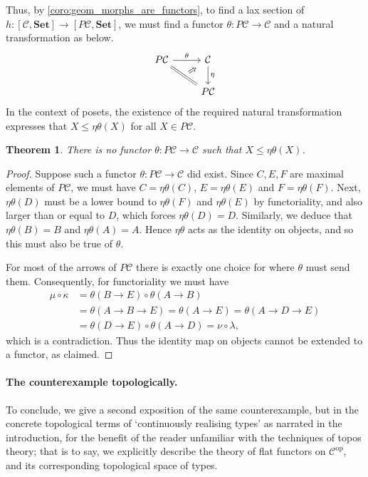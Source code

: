 \documentclass{article}
\theoremstyle{plain}
\newtheorem{thm}{Theorem}[section]
\theoremstyle{definition}
\newcommand{\cat}{\mathcal{C}}
\newcommand{\Set}{\mathbf{Set}}
\newcommand{\op}{^{\mathrm{op}}}
\begin{document}
	Thus, by \cref{coro:geom_morphs_are_functors}, to find a lax section of $h \colon [\cat,\Set] \to [P\cat,\Set]$, we must find a functor $\theta \colon P \cat \to \cat$ and a natural transformation as below.
	\[\begin{tikzcd}
		{P \cat} & \cat \\
		& {P \cat}
		\arrow["\theta", from=1-1, to=1-2]
		\arrow[""{name=0, anchor=center, inner sep=0}, equals, from=1-1, to=2-2]
		\arrow["\eta", from=1-2, to=2-2]
		\arrow["\Rightarrow"{marking, allow upside down}, draw=none, from=0, to=1-2]
	\end{tikzcd}\]
	In the context of posets, the existence of the required natural transformation expresses that $X \leqslant \eta \theta(X) $ for all $X \in P\cat$.
	\begin{thm}\label{thm:counterexample}
		There is no functor $\theta \colon P\cat \to \cat$ such that $X \leqslant \eta \theta (X)$.
	\end{thm}
	\begin{proof}
		Suppose such a functor $\theta \colon P \cat \to \cat$ did exist.  Since $C,E,F$ are maximal elements of $P \cat$, we must have $C = \eta \theta (C)$, $E = \eta \theta (E)$ and $F = \eta \theta (F)$.  Next, $\eta \theta (D)$ must be a lower bound to $\eta \theta (F)$ and $\eta \theta (E)$ by functoriality, and also larger than or equal to $D$, which forces $\eta \theta (D) = D$.  Similarly, we deduce that $\eta \theta (B) = B$ and $\eta \theta (A) = A$.  Hence $\eta \theta$ acts as the identity on objects, and so this must also be true of $\theta$.
		
		For most of the arrows of $P \cat$ there is exactly one choice for where $\theta$ must send them. Consequently, for functoriality we must have
		\begin{align*}
			\mu \circ \kappa &= \theta (B \to E) \circ \theta (A \to B) \\
			& = \theta (A \to B \to E) = \theta (A \to E) = \theta (A \to D \to E) \\
			& = \theta (D \to E) \circ \theta (A \to D) = \nu \circ \lambda,
		\end{align*}
		which is a contradiction. Thus the identity map on objects cannot be extended to a functor, as claimed.
	\end{proof}
	\paragraph*{The counterexample topologically.}
	To conclude, we give a second exposition of the same counterexample, but in the concrete topological terms of `continuously realising types' as narrated in the introduction, for the benefit of the reader unfamiliar with the techniques of topos theory; that is to say, we explicitly describe the theory of flat functors on $\cat\op$, and its corresponding topological space of types.
	
\end{document}
